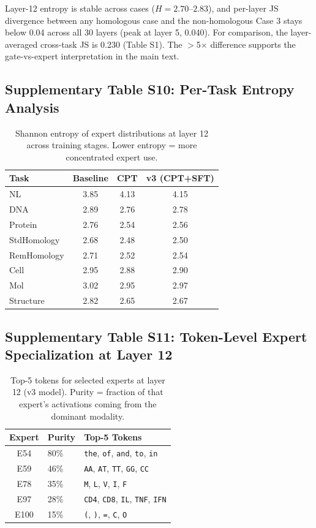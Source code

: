 \documentclass[11pt]{article}
\begin{document}
\noindent Layer-12 entropy is stable across cases ($H = 2.70$--$2.83$), and per-layer JS divergence between any homologous case and the non-homologous Case 3 stays below 0.04 across all 30 layers (peak at layer 5, 0.040). For comparison, the layer-averaged cross-task JS is 0.230 (Table S1). The $>$5$\times$ difference supports the gate-vs-expert interpretation in the main text.

\subsection{Supplementary Table S10: Per-Task Entropy Analysis}

\begin{table}[H]
\centering
\caption{Shannon entropy of expert distributions at layer 12 across training stages. Lower entropy = more concentrated expert use.}
\begin{tabular}{lccc}
\toprule
\textbf{Task} & \textbf{Baseline} & \textbf{CPT} & \textbf{v3 (CPT+SFT)} \\
\midrule
NL & 3.85 & 4.13 & 4.15 \\
DNA & 2.89 & 2.76 & 2.78 \\
Protein & 2.76 & 2.54 & 2.56 \\
StdHomology & 2.68 & 2.48 & 2.50 \\
RemHomology & 2.71 & 2.52 & 2.54 \\
Cell & 2.95 & 2.88 & 2.90 \\
Mol & 3.02 & 2.95 & 2.97 \\
Structure & 2.82 & 2.65 & 2.67 \\
\bottomrule
\end{tabular}
\end{table}

\subsection{Supplementary Table S11: Token-Level Expert Specialization at Layer 12}

\begin{table}[H]
\centering
\caption{Top-5 tokens for selected experts at layer 12 (v3 model). Purity = fraction of that expert's activations coming from the dominant modality.}
\begin{tabular}{clp{8cm}}
\toprule
\textbf{Expert} & \textbf{Purity} & \textbf{Top-5 Tokens} \\
\midrule
E54 & 80\% & \texttt{the}, \texttt{of}, \texttt{and}, \texttt{to}, \texttt{in} \\
E59 & 46\% & \texttt{AA}, \texttt{AT}, \texttt{TT}, \texttt{GG}, \texttt{CC} \\
E78 & 35\% & \texttt{M}, \texttt{L}, \texttt{V}, \texttt{I}, \texttt{F} \\
E97 & 28\% & \texttt{CD4}, \texttt{CD8}, \texttt{IL}, \texttt{TNF}, \texttt{IFN} \\
E100 & 15\% & \texttt{(}, \texttt{)}, \texttt{=}, \texttt{C}, \texttt{O} \\
\bottomrule
\end{tabular}
\end{table}
\end{document}
